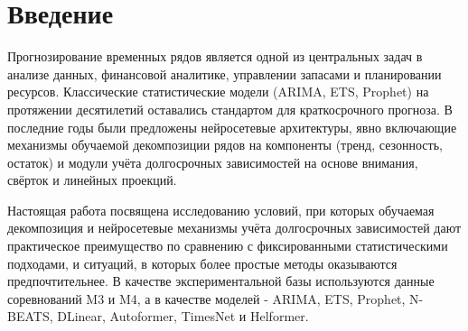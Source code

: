 \documentclass[a4paper,14pt]{extarticle}
\begin{document}
\setcounter{page}{2}  %

\renewcommand{\contentsname}{\hfill Оглавление \hfill}
\thispagestyle{empty}
\tableofcontents
\newpage

\section*{Введение}

Прогнозирование временных рядов является одной из центральных задач в
анализе данных, финансовой аналитике, управлении запасами и планировании
ресурсов.  Классические статистические модели (ARIMA, ETS, Prophet) на
протяжении десятилетий оставались стандартом для краткосрочного
прогноза.  В последние годы были предложены нейросетевые архитектуры,
явно включающие механизмы обучаемой декомпозиции рядов на компоненты
(тренд, сезонность, остаток) и модули учёта долгосрочных зависимостей на
основе внимания, свёрток и линейных проекций.

Настоящая работа посвящена исследованию условий, при которых обучаемая
декомпозиция и нейросетевые механизмы учёта долгосрочных зависимостей
дают практическое преимущество по сравнению с фиксированными
статистическими подходами, и ситуаций, в которых более простые методы
оказываются предпочтительнее.  В качестве экспериментальной базы
используются данные соревнований M3 и M4, а в качестве моделей -
ARIMA, ETS, Prophet, N-BEATS, DLinear, Autoformer, TimesNet и Helformer.

\newpage








\end{document}
